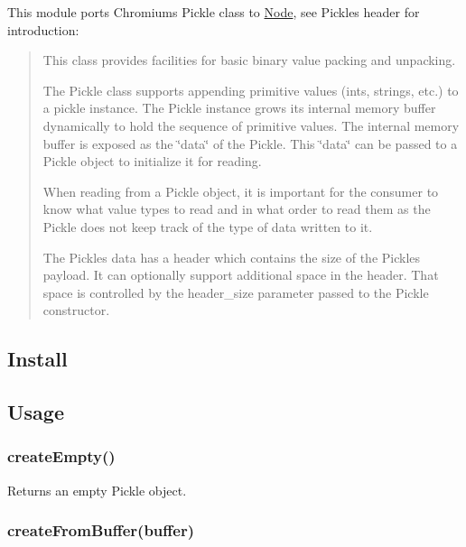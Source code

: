 This module ports Chromium\textquotesingle{}s {\ttfamily Pickle} class to \mbox{\hyperlink{classNode}{Node}}, see {\ttfamily Pickle}\textquotesingle{}s header for introduction\+:

\begin{quote}
This class provides facilities for basic binary value packing and unpacking.

The Pickle class supports appending primitive values (ints, strings, etc.) to a pickle instance. The Pickle instance grows its internal memory buffer dynamically to hold the sequence of primitive values. The internal memory buffer is exposed as the \char`\"{}data\char`\"{} of the Pickle. This \char`\"{}data\char`\"{} can be passed to a Pickle object to initialize it for reading.

When reading from a Pickle object, it is important for the consumer to know what value types to read and in what order to read them as the Pickle does not keep track of the type of data written to it.

The Pickle\textquotesingle{}s data has a header which contains the size of the Pickle\textquotesingle{}s payload. It can optionally support additional space in the header. That space is controlled by the header\+\_\+size parameter passed to the Pickle constructor. \end{quote}


\subsection*{Install}




\subsection*{Usage}

\subsubsection*{create\+Empty()}

Returns an empty {\ttfamily Pickle} object.

\subsubsection*{create\+From\+Buffer(buffer)}


